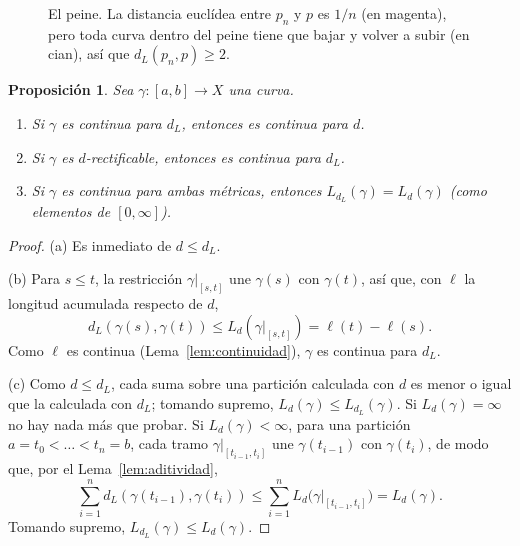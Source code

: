 \documentclass[12pt, a4paper]{amsart}
\newtheorem{proposicion}[teorema]{Proposición}
\theoremstyle{definition}
\theoremstyle{remark}
\begin{document}
\begin{figure}[htbp]
\centering
{}
\caption{El peine. La distancia euclídea entre $p_n$ y $p$ es $1/n$ (en magenta), pero toda curva dentro del peine tiene que bajar y volver a subir (en cian), así que $d_L(p_n,p)\ge2$.}
\label{fig:peine}
\end{figure}

\begin{proposicion}\label{prop:misma-longitud}
Sea $\gamma\colon[a,b]\to X$ una curva.
\begin{enumerate}[label=(\alph*)]
\item Si $\gamma$ es continua para $d_L$, entonces es continua para $d$.
\item Si $\gamma$ es $d$-rectificable, entonces es continua para $d_L$.
\item Si $\gamma$ es continua para ambas métricas, entonces $L_{d_L}(\gamma)=L_d(\gamma)$ (como elementos de $[0,\infty]$).
\end{enumerate}
\end{proposicion}

\begin{proof}
(a) Es inmediato de $d\le d_L$.

(b) Para $s\le t$, la restricción $\gamma|_{[s,t]}$ une $\gamma(s)$ con $\gamma(t)$, así que, con $\ell$ la longitud acumulada respecto de $d$,
\[
d_L(\gamma(s),\gamma(t))\le L_d(\gamma|_{[s,t]})=\ell(t)-\ell(s).
\]
Como $\ell$ es continua (Lema~\ref{lem:continuidad}), $\gamma$ es continua para $d_L$.

(c) Como $d\le d_L$, cada suma sobre una partición calculada con $d$ es menor o igual que la calculada con $d_L$; tomando supremo, $L_d(\gamma)\le L_{d_L}(\gamma)$. Si $L_d(\gamma)=\infty$ no hay nada más que probar. Si $L_d(\gamma)<\infty$, para una partición $a=t_0<\dots<t_n=b$, cada tramo $\gamma|_{[t_{i-1},t_i]}$ une $\gamma(t_{i-1})$ con $\gamma(t_i)$, de modo que, por el Lema~\ref{lem:aditividad},
\[
\sum_{i=1}^n d_L(\gamma(t_{i-1}),\gamma(t_i)) \le \sum_{i=1}^n L_d\big(\gamma|_{[t_{i-1},t_i]}\big) = L_d(\gamma).
\]
Tomando supremo, $L_{d_L}(\gamma)\le L_d(\gamma)$.
\end{proof}
\end{document}
